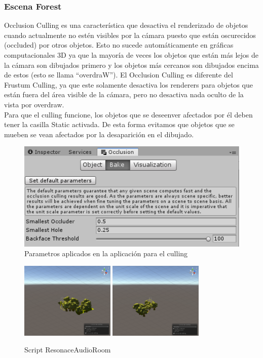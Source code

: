 	\subsubsection{Escena Forest}
\quad Occlusion Culling es una característica que desactiva el renderizado de objetos cuando actualmente no estén visibles por la cámara puesto que están oscurecidos (occluded) por otros objetos. Esto no sucede automáticamente en gráficas computacionales 3D ya que la mayoría de veces los objetos que están más lejos de la cámara son dibujados primero y los objetos más cercanos son dibujados encima de estos (esto se llama “overdraW”). El Occlusion Culling es diferente del Frustum Culling, ya que este solamente desactiva los renderers para objetos que están fuera del área visible de la cámara, pero no desactiva nada oculto de la vista por overdraw.\\

\quad Para que el culling funcione, los objetos que se deseenver afectados por él deben tener la casilla Static activada. De esta forma evitamos que objetos que se mueben se vean afectados por la desaparición en el dibujado.\\

\begin{figure}[htb]
	\centering
	\includegraphics[width=1\textwidth]{./imagenes/cullingdata}
	\caption{Parametros aplicados en la aplicación para el culling}
\end{figure}

\begin{figure}[htb]
	\centering
	\includegraphics[width=0.40\textwidth]{./imagenes/culling1}
	\includegraphics[width=0.40\textwidth]{./imagenes/culling2}
	\caption{Script ResonaceAudioRoom}
\end{figure}

